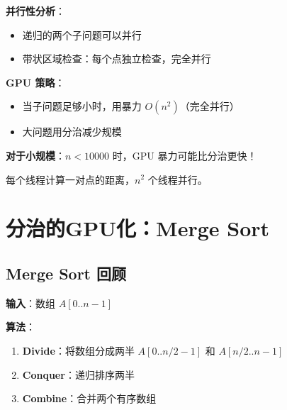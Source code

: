 \documentclass[12pt, a4paper]{ctexart}
\begin{document}
\begin{gpubox}

\textbf{并行性分析}：
\begin{itemize}
    \item 递归的两个子问题可以并行
    \item 带状区域检查：每个点独立检查，完全并行
\end{itemize}

\textbf{GPU 策略}：
\begin{itemize}
    \item 当子问题足够小时，用暴力 $O(n^2)$（完全并行）
    \item 大问题用分治减少规模
\end{itemize}

\textbf{对于小规模}：$n < 10000$ 时，GPU 暴力可能比分治更快！

每个线程计算一对点的距离，$n^2$ 个线程并行。

\end{gpubox}

\section{分治的GPU化：Merge Sort}

\subsection{Merge Sort 回顾}

\begin{blackboard}

\textbf{输入}：数组 $A[0..n-1]$

\textbf{算法}：
\begin{enumerate}
    \item \textbf{Divide}：将数组分成两半 $A[0..n/2-1]$ 和 $A[n/2..n-1]$
    \item \textbf{Conquer}：递归排序两半
    \item \textbf{Combine}：合并两个有序数组
\end{enumerate}

\end{blackboard}
\end{document}
